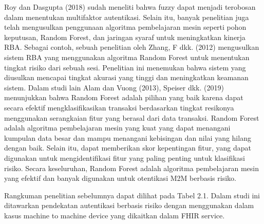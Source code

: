 Roy dan Dasgupta (2018) sudah meneliti bahwa fuzzy dapat menjadi terobosan
dalam menentukan multifaktor autentikasi. Selain itu, banyak penelitian juga telah
mengusulkan penggunaan algoritma pembelajaran mesin seperti pohon keputusan,
Random Forest, dan jaringan syaraf untuk meningkatkan kinerja RBA. Sebagai
contoh, sebuah penelitian oleh Zhang, F dkk. (2012) mengusulkan sistem RBA
yang menggunakan algoritma Random Forest untuk menentukan tingkat risiko dari
sebuah sesi. Penelitian ini menemukan bahwa sistem yang diusulkan mencapai
tingkat akurasi yang tinggi dan meningkatkan keamanan sistem. Dalam studi lain
Alam dan Vuong (2013), Speiser dkk. (2019) menunjukkan bahwa Random Forest
adalah pilihan yang baik karena dapat secara efektif mengklasifikasikan transaksi
berdasarkan tingkat resikonya menggunakan serangkaian fitur yang berasal dari
data transaksi. Random Forest adalah algoritma pembelajaran mesin yang kuat yang
dapat menangani kumpulan data besar dan mampu menangani kebisingan dan nilai
yang hilang dengan baik. Selain itu, dapat memberikan skor kepentingan fitur, yang
dapat digunakan untuk mengidentifikasi fitur yang paling penting untuk klasifikasi
risiko. Secara keseluruhan, Random Forest adalah algoritma pembelajaran mesin
yang efektif dan banyak digunakan untuk otentikasi M2M berbasis risiko.

Rangkuman penelitian sebelumnya dapat dilihat pada Tabel 2.1. Dalam studi
ini ditawarkan pendekatan autentikasi berbasis risiko dengan menggunakan dalam
kasus machine to machine device yang dikaitkan dalam FHIR service.


